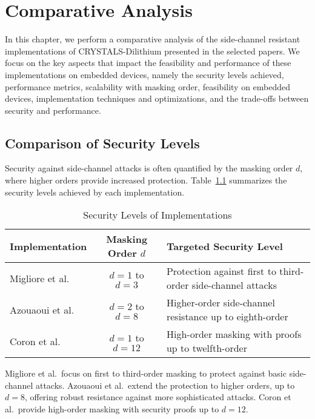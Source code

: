 
\chapter{Comparative Analysis}
\thispagestyle{chapterstart}

In this chapter, we perform a comparative analysis of the side-channel resistant implementations of CRYSTALS-Dilithium presented in the selected papers. We focus on the key aspects that impact the feasibility and performance of these implementations on embedded devices, namely the security levels achieved, performance metrics, scalability with masking order, feasibility on embedded devices, implementation techniques and optimizations, and the trade-offs between security and performance.

\section{Comparison of Security Levels}

Security against side-channel attacks is often quantified by the masking order $d$, where higher orders provide increased protection. Table~\ref{tab:security_levels} summarizes the security levels achieved by each implementation.

\begin{table}[h]
    \centering
    \renewcommand{\arraystretch}{1.2}
    \caption{Security Levels of Implementations}
    \begin{tabular}{l | c | p{7cm}}
        \toprule
        \textbf{Implementation}           & \textbf{Masking Order $d$} & \textbf{Targeted Security Level}                             \\
        \midrule
        Migliore et al.~\cite{Migliore19} & $d=1$ to $d=3$             & Protection against first to third-order side-channel attacks \\
        Azouaoui et al.~\cite{Azouaoui22} & $d=2$ to $d=8$             & Higher-order side-channel resistance up to eighth-order      \\
        Coron et al.~\cite{Coron23}       & $d=1$ to $d=12$            & High-order masking with proofs up to twelfth-order           \\
        \bottomrule
    \end{tabular}
    \label{tab:security_levels}
\end{table}

Migliore et al.\ focus on first to third-order masking to protect against basic side-channel attacks. Azouaoui et al.\ extend the protection to higher orders, up to $d=8$, offering robust resistance against more sophisticated attacks. Coron et al.\ provide high-order masking with security proofs up to $d=12$.

